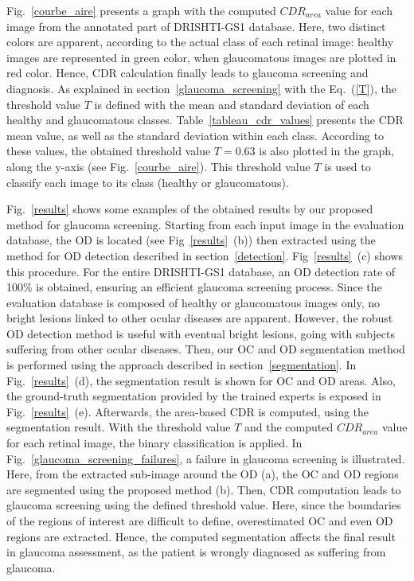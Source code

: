 



\mbox{Fig. \ref{courbe_aire}} presents a graph with the computed $CDR_{area}$ value for each image from the annotated part of DRISHTI-GS1 database. Here, two distinct colors are apparent, according to the actual class of each retinal image: healthy images are represented in green color, when glaucomatous images are plotted in red color. 
Hence, CDR calculation finally leads to glaucoma screening and diagnosis. 
As explained in \mbox{section \ref{glaucoma_screening}} with the \mbox{Eq. (\ref{T})}, the threshold value $T$ is defined with the mean and standard deviation of each healthy and glaucomatous classes. \mbox{Table \ref{tableau_cdr_values}} presents the CDR mean value, as well as the standard deviation within each class. According to these values, the obtained threshold value $T = 0.63$ is also plotted in the graph, along the y-axis (see \mbox{Fig. \ref{courbe_aire}}). This threshold value $T$ is used to classify each image to its class (healthy or glaucomatous). 




\mbox{Fig. \ref{results}} shows some examples of the obtained results by our proposed method for glaucoma screening. Starting from each input image in the evaluation database, the OD is located (see \mbox{Fig \ref{results} (b)}) then extracted using the method for OD detection described in \mbox{section \ref{detection}}. \mbox{Fig \ref{results} (c)} shows this procedure. For the entire DRISHTI-GS1 database, an OD detection rate of 100\% is obtained, ensuring an efficient glaucoma screening process. 
Since the evaluation database is composed of healthy or glaucomatous images only, no bright lesions linked to other ocular diseases are apparent. However, the robust OD detection method is useful with eventual bright lesions, going with subjects suffering from other ocular diseases.
Then, our OC and OD segmentation method is performed using the approach described in \mbox{section \ref{segmentation}}. 
In \mbox{Fig. \ref{results} (d)}, the segmentation result is shown for OC and OD areas. Also, the ground-truth segmentation provided by the trained experts is exposed in \mbox{Fig. \ref{results} (e)}. Afterwards, the area-based CDR is computed, using the segmentation result. With the threshold value $T$ and the computed $CDR_{area}$ value for each retinal image, the binary classification is applied.
In \mbox{Fig. \ref{glaucoma_screening_failures}}, a failure in glaucoma screening is illustrated. Here, from the extracted sub-image around the OD (a), the OC and OD regions are segmented using the proposed method (b). Then, CDR computation leads to glaucoma screening using the defined threshold value. Here, since the boundaries of the regions of interest are difficult to define, overestimated OC and even OD regions are extracted. Hence, the computed segmentation affects the final result in glaucoma assessment, as the patient is wrongly diagnosed as suffering from glaucoma.


